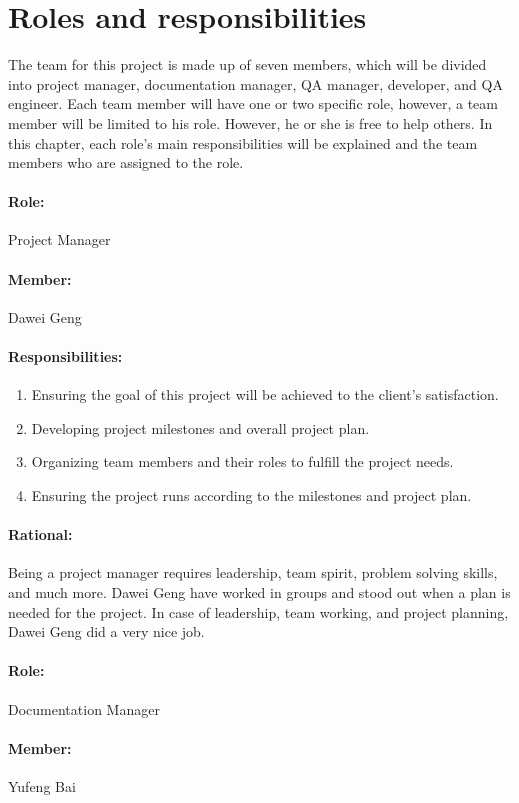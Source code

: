 \documentclass[11pt, a4paper]{report}
\begin{document}
\section{Roles and responsibilities}
The team for this project is made up of seven members, which will be divided into project manager, documentation manager, QA manager, developer, and QA engineer. Each team member will have one or two specific role, however, a team member will be limited to his role. However, he or she is free to help others. In this chapter, each role's main responsibilities will be explained and the team members who are assigned to the role.

\paragraph{Role: } Project Manager
\paragraph{Member: } Dawei Geng
\paragraph{Responsibilities: }
\begin{enumerate}
	\item  Ensuring the goal of this project will be achieved to the client's satisfaction.
	\item  Developing project milestones and overall project plan.
	\item  Organizing team members and their roles to fulfill the project needs.
	\item  Ensuring the project runs according to the milestones and project plan.
\end{enumerate}
\paragraph{Rational: \\}
Being a project manager requires leadership, team spirit, problem solving skills, and much more. Dawei Geng have worked in groups and stood out when a plan is needed for the project. In case of leadership, team working, and project planning, Dawei Geng did a very nice job. 

\paragraph{Role: } Documentation Manager
\paragraph{Member: } Yufeng Bai
\end{document}
